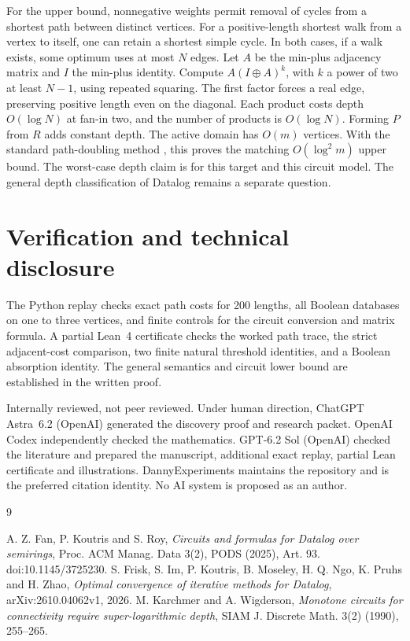 \documentclass[11pt]{amsart}
\begin{document}
For the upper bound, nonnegative weights permit removal of
cycles from a shortest path between distinct vertices.
For a positive-length shortest walk from a vertex to itself,
one can retain a shortest simple cycle. In both cases, if a
walk exists, some optimum uses at most \(N\) edges. Let \(A\)
be the min-plus adjacency matrix and \(I\) the min-plus
identity. Compute \(A(I\oplus A)^k\), with \(k\) a power of
two at least \(N-1\), using repeated squaring. The first factor
forces a real edge, preserving positive length even on the
diagonal. Each product costs depth \(O(\log N)\) at fan-in
two, and the number of products is \(O(\log N)\). Forming
\(P\) from \(R\) adds constant depth. The active domain has
\(O(m)\) vertices. With the standard path-doubling method
\cite[Sec.~5]{fkr}, this proves the matching \(O(\log^2 m)\)
upper bound. The worst-case depth claim is for this target
and this circuit model. The general depth classification of
Datalog remains a separate question.

\section*{Verification and technical disclosure}
The Python replay checks exact path costs for 200 lengths,
all Boolean databases on one to three vertices, and finite
controls for the circuit conversion and matrix formula.
A partial Lean~4 certificate checks the worked path trace,
the strict adjacent-cost comparison, two finite natural
threshold identities, and a Boolean absorption identity.
The general semantics and circuit lower bound are established
in the written proof.

Internally reviewed, not peer reviewed. Under human direction,
ChatGPT Astra~6.2 (OpenAI) generated the discovery proof and
research packet. OpenAI Codex independently checked the
mathematics. GPT-6.2 Sol (OpenAI) checked the literature and
prepared the manuscript, additional exact replay, partial Lean
certificate and illustrations. DannyExperiments maintains the
repository and is the preferred citation identity. No AI system
is proposed as an author.

\begin{thebibliography}{9}
\raggedright
{} A. Z. Fan, P. Koutris and S. Roy,
\emph{Circuits and formulas for Datalog over semirings},
Proc. ACM Manag. Data 3(2), PODS (2025), Art. 93.
doi:10.1145/3725230.
 S. Frisk, S. Im, P. Koutris, B. Moseley,
H. Q. Ngo, K. Pruhs and H. Zhao,
\emph{Optimal convergence of iterative methods for Datalog},
arXiv:2610.04062v1, 2026.
 M. Karchmer and A. Wigderson,
\emph{Monotone circuits for connectivity require super-logarithmic depth},
SIAM J. Discrete Math. 3(2) (1990), 255--265.
\end{thebibliography}
\end{document}
